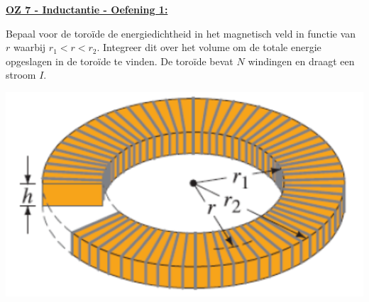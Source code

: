 \textbf{\underline{OZ 7 - Inductantie - Oefening 1:}}
\vspace{0.5cm}

Bepaal voor de toroïde de energiedichtheid in het magnetisch veld in
functie van $r$ waarbij $r_1 < r < r_2$. Integreer dit over het volume om de totale energie
opgeslagen in de toroïde te vinden. De toroïde bevat $N$ windingen en draagt een
stroom $I$.

\begin{center}
    \includegraphics[scale = 0.3]{oz07/resources/Oz7Oef1.png}
\end{center}

\begin{description}[labelwidth=1.5cm, leftmargin=!]
    \item[Geg. :] 
    \item[Gevr. :] 
    \item[Opl. :]
\end{description}

\vspace{1cm}